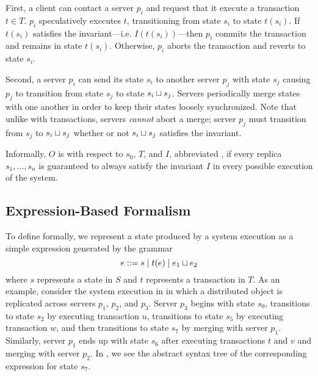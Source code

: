 First, a client can contact a server $p_i$ and request that it execute a
transaction $t \in T$. $p_i$ speculatively executes $t$, transitioning from
state $s_i$ to state $t(s_i)$. If $t(s_i)$ satisfies the invariant---i.e.
$I(t(s_i))$---then $p_i$ commits the transaction and remains in state $t(s_i)$.
Otherwise, $p_i$ aborts the transaction and reverts to state $s_i$.

Second, a server $p_i$ can send its state $s_i$ to another server $p_j$ with
state $s_j$ causing $p_j$ to transition from state $s_j$ to state $s_i \sqcup
s_j$. Servers periodically merge states with one another in order to keep their
states loosely synchronized. Note that unlike with transactions, servers
\emph{cannot} abort a merge; server $p_j$ must transition from $s_j$ to $s_i
\sqcup s_j$ whether or not $s_i \sqcup s_j$ satisfies the invariant.

Informally, $O$ is  with respect to $s_0$, $T$,
and $I$, abbreviated , if every replica $s_1, \ldots,
s_n$ is guaranteed to always satisfy the invariant $I$ in every possible
execution of the system.

\subsection{Expression-Based Formalism}
To define \invariantconfluence{} formally, we represent a state produced by a
system execution as a simple expression generated by the grammar
\[
  e ::= s \mid t(e) \mid e_1 \sqcup e_2
\]
where $s$ represents a state in $S$ and $t$ represents a transaction in $T$. As
an example, consider the system execution in  in which
a distributed object is replicated across servers $p_1$, $p_2$, and $p_3$.
Server $p_3$ begins with state $s_0$, transitions to state $s_2$ by executing
transaction $u$, transitions to state $s_5$ by executing transaction $w$, and
then transitions to state $s_7$ by merging with server $p_1$. Similarly, server
$p_1$ ends up with state $s_6$ after executing transactions $t$ and $v$ and
merging with server $p_2$. In , we see the abstract syntax
tree of the corresponding expression for state $s_7$.

{}

